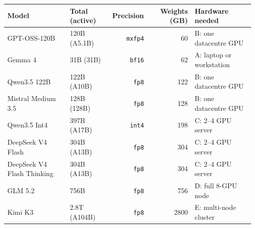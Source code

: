 \begin{tabular}{llrrl}
\toprule
Model & Total (active) & Precision & Weights (GB) & Hardware needed \\
\midrule
GPT-OSS-120B & 120B (A5.1B) & \texttt{mxfp4} & 60 & B: one datacentre GPU \\
Gemma 4 & 31B (31B) & \texttt{bf16} & 62 & A: laptop or workstation \\
Qwen3.5 122B & 122B (A10B) & \texttt{fp8} & 122 & B: one datacentre GPU \\
Mistral Medium 3.5 & 128B (128B) & \texttt{fp8} & 128 & B: one datacentre GPU \\
Qwen3.5 Int4 & 397B (A17B) & \texttt{int4} & 198 & C: 2--4 GPU server \\
DeepSeek V4 Flash & 304B (A13B) & \texttt{fp8} & 304 & C: 2--4 GPU server \\
DeepSeek V4 Flash Thinking & 304B (A13B) & \texttt{fp8} & 304 & C: 2--4 GPU server \\
GLM 5.2 & 756B & \texttt{fp8} & 756 & D: full 8-GPU node \\
Kimi K3 & 2.8T (A104B) & \texttt{fp8} & 2800 & E: multi-node cluster \\
\bottomrule
\end{tabular}
